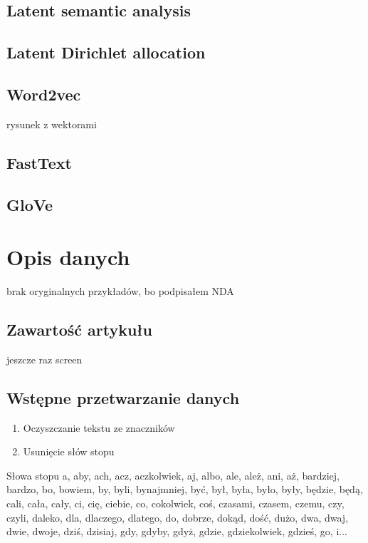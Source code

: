 \documentclass{beamer}
\begin{document}
	\subsection{Latent semantic analysis}
	\subsection{Latent Dirichlet allocation}
	\subsection{Word2vec}
	\begin{frame}
		rysunek z wektorami
	\end{frame}
	\subsection{FastText}
	\subsection{GloVe}
	
	
	\section{Opis danych}
	brak oryginalnych przykładów, bo podpisałem NDA
	\subsection{Zawartość artykułu}
	\begin{frame}
		jeszcze raz screen
	\end{frame}
	\subsection{Wstępne przetwarzanie danych}
	\begin{frame}
		\begin{enumerate}
			\item Oczyszczanie tekstu ze znaczników \pause
			\item Usunięcie słów stopu
		\end{enumerate}
	\end{frame}
	\begin{frame}{Słowa stopu}
		a, aby, ach, acz, aczkolwiek, aj, albo, ale, ależ, ani, aż, bardziej, bardzo, bo, bowiem, by, byli, bynajmniej, być, był, była, było, były, będzie, będą, cali, cała, cały, ci, cię, ciebie, co, cokolwiek, coś, czasami, czasem, czemu, czy, czyli, daleko, dla, dlaczego, dlatego, do, dobrze, dokąd, dość, dużo, dwa, dwaj, dwie, dwoje, dziś, dzisiaj, gdy, gdyby, gdyż, gdzie, gdziekolwiek, gdzieś, go, i...
	\end{frame}
\end{document}
